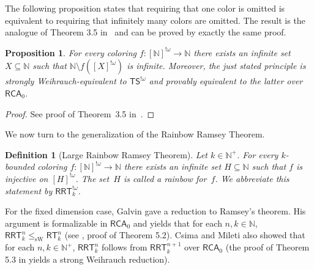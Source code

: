 \documentclass{article}
\newcommand{\RCA}[0]{\mathsf{RCA}}
\newcommand{\RRT}[0]{\mathsf{RRT}}
\newcommand{\TS}[0]{\mathsf{TS}}
\newcommand{\RT}[0]{\mathsf{RT}}
\newcommand{\NN}[0]{\mathbb{N}}
\newcommand{\sW}{\mathrm{sW}}
\numberwithin{theorem}{section}
\newtheorem{proposition}[theorem]{Proposition}
\newtheorem{definition}[theorem]{Definition}
\newcommand{\ludovic}[1]{\textcolor{blue}{#1}}
\newcommand{\lorenzo}[1]{\textcolor{orange}{#1}}
\begin{document}

The following proposition states that requiring that one color is omitted is equivalent to requiring that infinitely many colors are omitted. The result is the analogue of Theorem 3.5 in~\cite{Cholak_Giusto_Hirst_Jockusch_2005} and can be proved by exactly the same proof.

\begin{proposition}
    For every coloring $f:[\NN]^{!\omega} \to \NN$ there exists an infinite set $X\subseteq\NN$ such that $\NN\setminus f([X]^{!\omega})$ is infinite. Moreover, the just stated principle is strongly Weihrauch-equivalent to $\TS^{!\omega}$ and provably equivalent to the latter over $\RCA_0$.
\end{proposition}

\begin{proof}
See proof of Theorem~3.5 in~\cite{Cholak_Giusto_Hirst_Jockusch_2005}.

\end{proof}

We now turn to the generalization of the Rainbow Ramsey Theorem. 

\begin{definition}[Large Rainbow Ramsey Theorem]
Let $k\in \NN^+$. For every $k$-bounded coloring $f:[\NN]^{!\omega} \to \NN$ there exists an infinite set $H\subseteq \NN$ such that $f$ is injective on $[H]^{!\omega}$. The set~$H$ is called a \emph{rainbow} for~$f$. We abbreviate this statement by $\RRT^{!\omega}_k$.
\end{definition}

For the fixed dimension case, Galvin gave a reduction to Ramsey's theorem. His argument is formalizable in $\RCA_0$ and yields that for each $n, k\in\NN$, $\RRT^n_k \leq_\sW \RT^n_k$ (see \cite{CsimaMileti_2009}, proof of Theorem 5.2). Csima and Mileti also showed that for each $n,k\in\NN^+$, $\RRT^n_k$ follows from $\RRT^{n+1}_k$ over $\RCA_0$ (the proof of Theorem 5.3 in \cite{CsimaMileti_2009} yields a strong Weihrauch reduction).%
\end{document}
